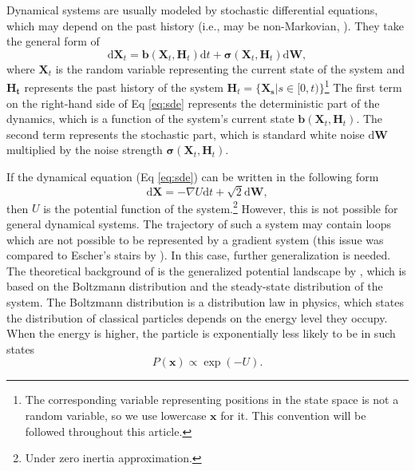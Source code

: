 Dynamical systems are usually modeled by stochastic differential equations, which may depend on the past history (i.e., may be non-Markovian, \citet{StumpfEtAlModelingStemCell2021}). They take the general form of
\begin{equation}
\mathrm{d} \boldsymbol{X}_t = \boldsymbol{b}(\boldsymbol{X}_t, \boldsymbol{H}_t){\mathrm{d}t} + \boldsymbol{\sigma}( \boldsymbol{X}_t, \boldsymbol{H}_t)\mathrm{d}\boldsymbol{W},
\label{eq:sde}
\end{equation}
where \(\boldsymbol{X}_t\) is the random variable representing the current state of the system and \(\boldsymbol{H_t}\) represents the past history of the system \(\boldsymbol{H}_t=\{\boldsymbol{X_s} | s \in [0, t)\}\)\footnote{The corresponding variable representing positions in the state space is not a random variable, so we use lowercase \(\boldsymbol{x}\) for it. This convention will be followed throughout this article.} The first term on the right-hand side of Eq \eqref{eq:sde} represents the deterministic part of the dynamics, which is a function of the system's current state \(\boldsymbol{b}(\boldsymbol{X}_t, \boldsymbol{H}_t)\). The second term represents the stochastic part, which is standard white noise \(\mathrm{d}\boldsymbol{W}\) multiplied by the noise strength \(\boldsymbol{\sigma}( \boldsymbol{X}_t, \boldsymbol{H}_t)\).

If the dynamical equation (Eq \eqref{eq:sde}) can be written in the following form
\begin{equation}
\mathrm{d} \boldsymbol{X} = - \nabla U {\mathrm{d} t} +\sqrt{2}\mathrm{d}\boldsymbol{W},
\label{eq:canon}
\end{equation}
then \(U\) is the potential function of the system.\footnote{Under zero inertia approximation.} However, this is not possible for general dynamical systems. The trajectory of such a system may contain loops which are not possible to be represented by a gradient system (this issue was compared to Escher's stairs by \citet{rodriguez-sanchezClimbingEscherStairs2020}). In this case, further generalization is needed. The theoretical background of  is the generalized potential landscape by \citet{wangPotentialLandscapeFlux2008}, which is based on the Boltzmann distribution and the steady-state distribution of the system. The Boltzmann distribution is a distribution law in physics, which states the distribution of classical particles depends on the energy level they occupy. When the energy is higher, the particle is exponentially less likely to be in such states
\begin{equation}
P(\boldsymbol{x}) \propto \exp (-U).
\label{eq:Boltzmann}
\end{equation}

